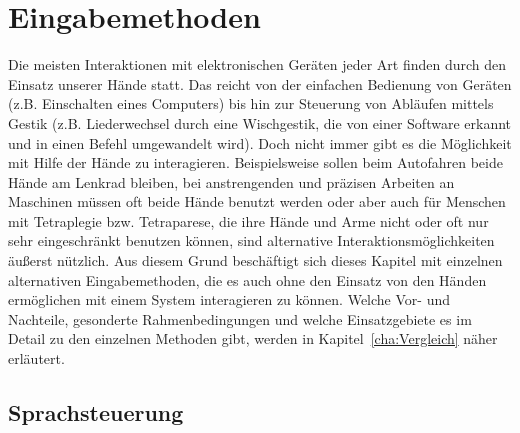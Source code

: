 \chapter{Eingabemethoden}
\label{cha:Eingabe}

Die meisten Interaktionen mit elektronischen Geräten jeder Art finden durch den Einsatz unserer Hände statt. Das reicht von der einfachen Bedienung von Geräten (z.B. Einschalten eines Computers) bis hin zur Steuerung von Abläufen mittels Gestik (z.B. Liederwechsel durch eine Wischgestik, die von einer Software erkannt und in einen Befehl umgewandelt wird). Doch nicht immer gibt es die Möglichkeit mit Hilfe der Hände zu interagieren. Beispielsweise sollen beim Autofahren beide Hände am Lenkrad bleiben, bei anstrengenden und präzisen Arbeiten an Maschinen müssen oft beide Hände benutzt werden oder aber auch für Menschen mit Tetraplegie bzw. Tetraparese, die ihre Hände und Arme nicht oder oft nur sehr eingeschränkt benutzen können, sind alternative Interaktionsmöglichkeiten äußerst nützlich. Aus diesem Grund beschäftigt sich dieses Kapitel mit einzelnen alternativen Eingabemethoden, die es auch ohne den Einsatz von den Händen ermöglichen mit einem System interagieren zu können. Welche Vor- und Nachteile, gesonderte Rahmenbedingungen und welche Einsatzgebiete es im Detail zu den einzelnen Methoden gibt, werden in Kapitel~\ref{cha:Vergleich} näher erläutert. 

\section{Sprachsteuerung}

